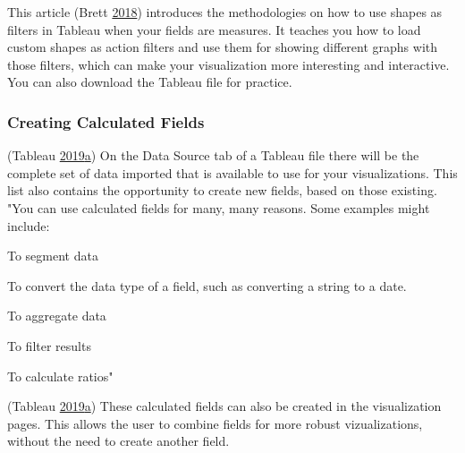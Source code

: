 \documentclass[]{book}
\begin{document}
This article (Brett \protect\hyperlink{ref-measures}{2018}) introduces the methodologies on how to use shapes as filters in Tableau when your fields are measures. It teaches you how to load custom shapes as action filters and use them for showing different graphs with those filters, which can make your visualization more interesting and interactive. You can also download the Tableau file for practice.

\hypertarget{creating-calculated-fields}{%
\subsubsection{Creating Calculated Fields}\label{creating-calculated-fields}}

(Tableau \protect\hyperlink{ref-Tableau_Calculated_Fields}{2019}\protect\hyperlink{ref-Tableau_Calculated_Fields}{a})
On the Data Source tab of a Tableau file there will be the complete set of data imported that is available to use for your visualizations. This list also contains the opportunity to create new fields, based on those existing.
"You can use calculated fields for many, many reasons.
Some examples might include:

To segment data

To convert the data type of a field, such as converting a string to a date.

To aggregate data

To filter results

To calculate ratios"

(Tableau \protect\hyperlink{ref-Tableau_Calculated_Fields}{2019}\protect\hyperlink{ref-Tableau_Calculated_Fields}{a})
These calculated fields can also be created in the visualization pages. This allows the user to combine fields for more robust vizualizations, without the need to create another field.
\end{document}
